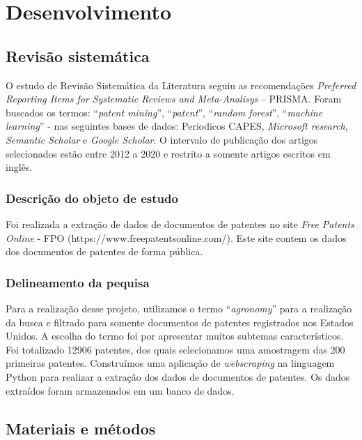 

\chapter{Desenvolvimento}\label{cap_exemplos}

\section{Revisão sistemática}
O estudo de Revisão Sistemática da Literatura seguiu as recomendações \textit{Preferred Reporting Items for Systematic Reviews and Meta-Analisys} – PRISMA.
Foram buscados os termos: “\textit{patent mining}”, “\textit{patent}”, “\textit{random forest}”, “\textit{machine learning}” - nas seguintes bases de dados: Periodicos CAPES, \textit{Microsoft research}, \textit{Semantic Scholar} e \textit{Google Scholar}. O intervalo de publicação dos artigos selecionados estão entre 2012 a 2020 e restrito a somente artigos escritos em inglês.

\subsection{Descrição do objeto de estudo}
Foi realizada a extração de dados de documentos de patentes no site \textit{Free Patents Online} - FPO (https://www.freepatentsonline.com/). Este site contem os dados dos documentos de patentes de forma pública.

\subsection{Delineamento da pequisa}
Para a realização desse projeto, utilizamos o termo “\textit{agronomy}” para a realização da busca e filtrado para somente documentos de patentes registrados nos Estados Unidos. A escolha do termo foi por apresentar muitos subtemas característicos. Foi totalizado 12906 patentes, dos quais selecionamos uma amostragem das 200 primeiras patentes. Construímos uma aplicação de \textit{webscraping} na linguagem Python para realizar a extração dos dados de documentos de patentes.  Os dados extraídos foram armazenados em um banco de dados.

\section{Materiais e métodos}

